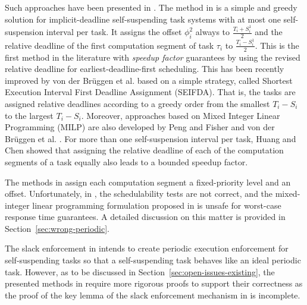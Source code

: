 Such approaches have been presented in 
\cite{RTSS-KimANR13,RTSS-ChenL14,WC16-suspend-DATE,DBLP:journals/ieicet/DingTT09}. The method in \cite{RTSS-ChenL14} is a simple and greedy solution for 
implicit-deadline self-suspending task systems with at most one self-suspension interval per task. It assigns the 
offset $\phi_i^2$ always to $\frac{T_i+S_i^1}{2}$ and the relative deadline of the first computation segment of task $\tau_i$ to 
$\frac{T_i-S_i^1}{2}$. This is the first method in the literature with \emph{speedup factor} guarantees by using the revised relative 
deadline for earliest-deadline-first scheduling. This has been recently improved 
by von der Br\"uggen et al. \cite{Bruggen16RTNS} based on a simple strategy, called Shortest Execution Interval First Deadline
Assignment (SEIFDA). That is, the tasks are assigned relative deadlines according to a greedy order from the smallest $T_i-S_i$ to the largest $T_i-S_i$.
Moreover, approaches based on Mixed Integer Linear Programming (MILP) are also developed by Peng and Fisher \cite{Peng-Fisher-RTCSA2016} and von der Br\"uggen et al. \cite{Bruggen16RTNS}.
For more than one self-suspension interval per task, Huang and Chen \cite{WC16-suspend-DATE} showed that assigning the relative deadline of each of the computation segments of a task equally also leads to a bounded speedup factor.



The methods in \cite{RTSS-KimANR13,DBLP:journals/ieicet/DingTT09} assign each computation segment a fixed-priority level and an offset. 
Unfortunately,  in \cite{RTSS-KimANR13,DBLP:journals/ieicet/DingTT09}, the schedulability tests are not correct, and the mixed-integer 
linear programming formulation proposed in \cite{RTSS-KimANR13} is unsafe for worst-case response time guarantees. 
A detailed discussion on this matter is 
provided in Section~\ref{sec:wrong-periodic}.

\label{sec:slack-enforce}

The slack enforcement in \cite{LR:rtas10} intends to create periodic execution enforcement 
for self-suspending tasks so that a self-suspending task behaves like an ideal periodic task.  However, as to be discussed in 
Section~\ref{sec:open-issues-existing}, the presented methods in \cite{LR:rtas10} require more rigorous proofs to support 
their correctness as the proof of the key lemma of the slack enforcement mechanism in \cite{LR:rtas10} is incomplete.

\label{sec:multiprocessor-HRT}
  
